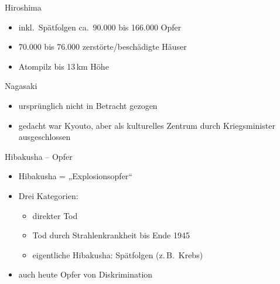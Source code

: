 \begin{frame}{Hiroshima}
	\begin{itemize}
		\item inkl.\ Spätfolgen ca.\ 90.000 bis 166.000 Opfer
		\pause
		\item 70.000 bis 76.000 zerstörte/beschädigte Häuser
		\pause
		\item Atompilz bis 13\,km Höhe
	\end{itemize}
\end{frame}

\begin{frame}{Nagasaki}
	\begin{itemize}
		\item ursprünglich nicht in Betracht gezogen
		\item gedacht war Kyouto, aber als kulturelles Zentrum durch
			Kriegsminister ausgeschlossen
	\end{itemize}
\end{frame}

\begin{frame}{Hibakusha -- Opfer}
	\begin{itemize}
		\item Hibakusha = „Explosionsopfer“
		\pause
		\item Drei Kategorien:
			\pause \begin{itemize}
			\item direkter Tod
			\pause
			\item Tod durch Strahlenkrankheit bis Ende 1945
			\pause
			\item eigentliche Hibakusha: Spätfolgen (z.\,B.\ Krebs)
			\pause
		\end{itemize}
		\item auch heute Opfer von Diskrimination
	\end{itemize}
\end{frame}


